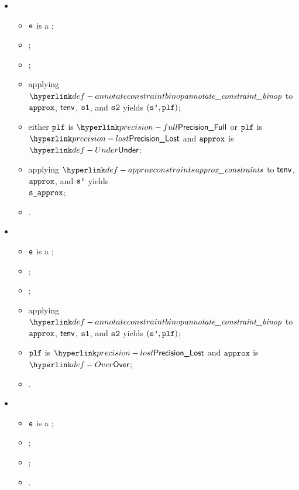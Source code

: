 \begin{itemize}
  \item {}
  \begin{itemize}
    \item $\texttt{e}$ is a \binopexpression{$\op$}{$\veone$}{$\vetwo$};
    \item \Proseapproxexpr{$\tenv$}{$\vapprox$}{$\veone$}{$\vsone$}\ProseTerminateAs{\CannotOverapproximate};
    \item \Proseapproxexpr{$\tenv$}{$\vapprox$}{$\vetwo$}{$\vstwo$}\ProseTerminateAs{\CannotOverapproximate};
    \item applying $\annotateconstraintbinop$ to $\vapprox$, $\tenv$, $\vsone$, and $\vstwo$ yields $(\texttt{s'}, \texttt{plf})$;
    \item either $\texttt{plf}$ is $\PrecisionFull$ or $\texttt{plf}$ is $\PrecisionLost$ and $\vapprox$ is $\Under$;
    \item applying $\approxconstraints$ to $\tenv$, $\vapprox$, and $\texttt{s'}$ yields \\
          $\vsapprox$\ProseTerminateAs{\CannotOverapproximate};
    \item \Proseeqdef{$\vs$}{$\vsapprox$}.
  \end{itemize}

  \item {}
  \begin{itemize}
    \item $\texttt{e}$ is a \binopexpression{$\op$}{$\veone$}{$\vetwo$};
    \item \Proseapproxexpr{$\tenv$}{$\vapprox$}{$\veone$}{$\vsone$}\ProseTerminateAs{\CannotOverapproximate};
    \item \Proseapproxexpr{$\tenv$}{$\vapprox$}{$\vetwo$}{$\vstwo$}\ProseTerminateAs{\CannotOverapproximate};
    \item applying $\annotateconstraintbinop$ to $\vapprox$, $\tenv$, $\vsone$, and $\vstwo$ yields $(\texttt{s'}, \texttt{plf})$;
    \item $\texttt{plf}$ is $\PrecisionLost$ and $\vapprox$ is $\Over$;
    \item \Proseeqdef{$\vs$}{$\CannotOverapproximate$}.
  \end{itemize}

  \item {}
  \begin{itemize}
    \item $\texttt{e}$ is a ;
    \item \Proseapproxexpr{$\tenv$}{$\vapprox$}{$\vetwo$}{$\vstwo$}\ProseTerminateAs{\CannotOverapproximate};
    \item \Proseapproxexpr{$\tenv$}{$\vapprox$}{$\vethree$}{$\vsthree$}\ProseTerminateAs{\CannotOverapproximate};
    \item {}.
  \end{itemize}


\end{itemize}

